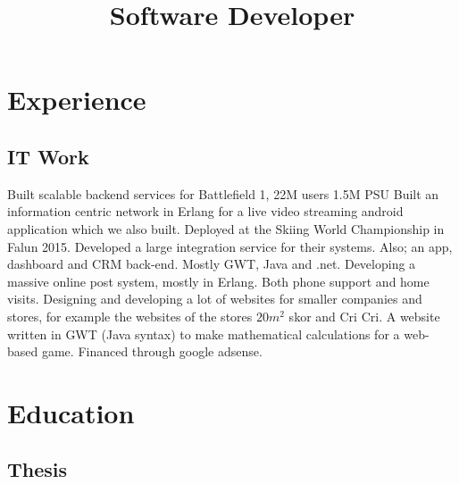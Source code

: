 \documentclass[11pt,a4paper]{moderncv}
\title{Software Developer}
\begin{document}
\maketitle
\section{\textbf{Experience}}
\subsection{\textbf{IT Work}}
{Built scalable backend services for Battlefield 1, 22M users 1.5M PSU}
{Built an information centric network in Erlang for a live video streaming android application which we also built. 
Deployed at the Skiing World Championship in Falun 2015.}
{Developed a large integration service for their systems. Also; an app, dashboard and CRM back-end. Mostly GWT, Java and .net.}
{Developing a massive online post system, mostly in Erlang.}
{Both phone support and home visits.}
{Designing and developing a lot of websites for smaller companies and stores, for example the websites of the stores \begin{math}20m^2\end{math} skor and Cri Cri.}
{A website written in GWT (Java syntax) to make mathematical calculations for a web-based game. Financed through google adsense.}
\newpage

\section{\textbf{Education}}

\subsection{\textbf{Thesis}}
\end{document}
